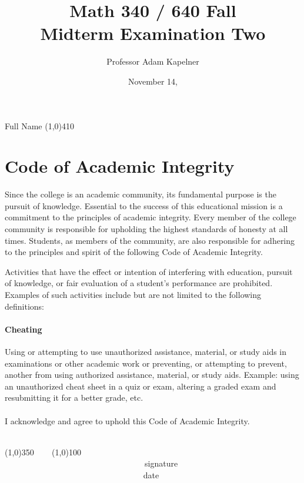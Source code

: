 \documentclass[12pt]{article}
\title{Math 340 / 640 Fall \the\year{} \\ Midterm Examination Two}
\author{Professor Adam Kapelner}
\date{November 14, \the\year{}}
\begin{document}
\maketitle

\noindent Full Name \line(1,0){410}

\thispagestyle{empty}

\section*{Code of Academic Integrity}

\footnotesize
Since the college is an academic community, its fundamental purpose is the pursuit of knowledge. Essential to the success of this educational mission is a commitment to the principles of academic integrity. Every member of the college community is responsible for upholding the highest standards of honesty at all times. Students, as members of the community, are also responsible for adhering to the principles and spirit of the following Code of Academic Integrity.

Activities that have the effect or intention of interfering with education, pursuit of knowledge, or fair evaluation of a student's performance are prohibited. Examples of such activities include but are not limited to the following definitions:

\paragraph{Cheating} Using or attempting to use unauthorized assistance, material, or study aids in examinations or other academic work or preventing, or attempting to prevent, another from using authorized assistance, material, or study aids. Example: using an unauthorized cheat sheet in a quiz or exam, altering a graded exam and resubmitting it for a better grade, etc.\\
\\
\noindent I acknowledge and agree to uphold this Code of Academic Integrity. \\~\\

\begin{center}
\line(1,0){350} ~~~ \line(1,0){100}\\
~~~~~~~~~~~~~~~~~~~~~~~~~~~~~~~~~~signature~~~~~~~~~~~~~~~~~~~~~~~~~~~~~~~~~~~~~~~~~~~~~~~~~~~~~~~~~~~~~~ date
\end{center}

\normalsize
\end{document}
